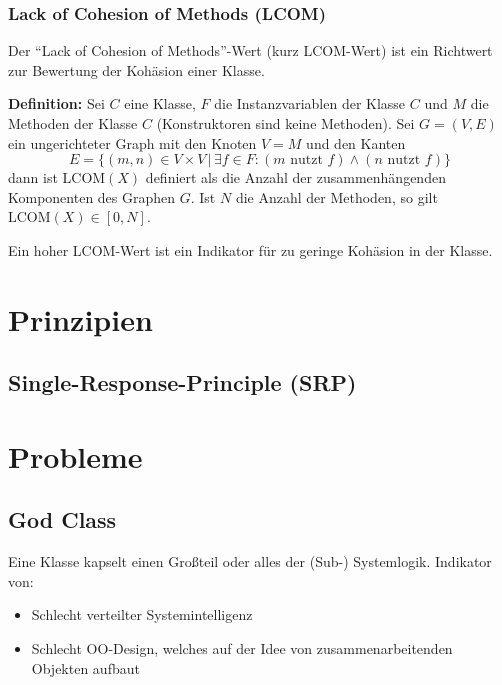 			\subsubsection{Lack of Cohesion of Methods (LCOM)}
				Der \enquote{Lack of Cohesion of Methods}-Wert (kurz LCOM-Wert) ist ein Richtwert zur Bewertung der Kohäsion einer Klasse.
				
				\textbf{Definition:} Sei $ C $ eine Klasse, $ F $ die Instanzvariablen der Klasse $ C $ und $ M $ die Methoden der Klasse $ C $ (Konstruktoren sind keine Methoden). Sei $ G = (V, E) $ ein ungerichteter Graph mit den Knoten $ V = M $ und den Kanten \[ E = \{ (m, n) \in V \times V \,|\, \exists f \in F : (m \text{ nutzt } f) \land (n \text{ nutzt } f) \} \] dann ist $ \text{LCOM}(X) $ definiert als die Anzahl der zusammenhängenden Komponenten des Graphen $ G $. Ist $ N $ die Anzahl der Methoden, so gilt $ \text{LCOM}(X) \in [0, N] $.
				
				Ein hoher LCOM-Wert ist ein Indikator für zu geringe Kohäsion in der Klasse.
	
	\section{Prinzipien}
		\subsection{Single-Response-Principle (SRP)}
	
	\section{Probleme}
		\subsection{God Class}
			Eine Klasse kapselt einen Großteil oder alles der (Sub-) Systemlogik. Indikator von:
			\begin{itemize}
				\item Schlecht verteilter Systemintelligenz
				\item Schlecht OO-Design, welches auf der Idee von zusammenarbeitenden Objekten aufbaut
			\end{itemize}
			
